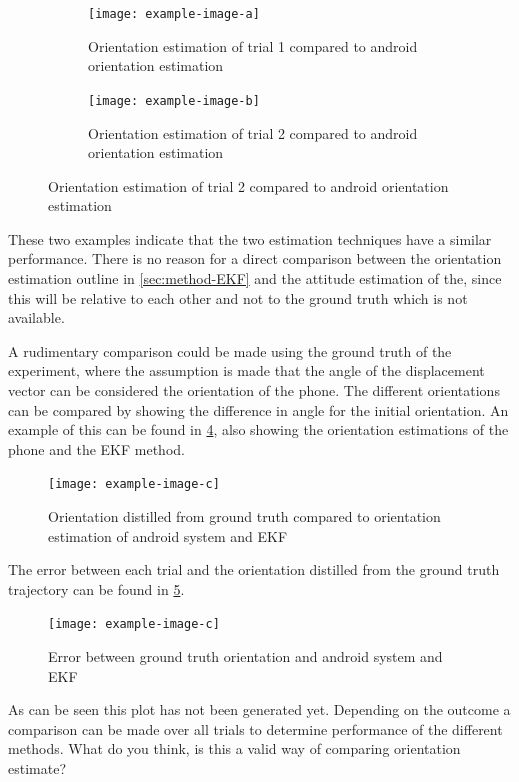\begin{figure}[H]
	\centering
	\begin{subfigure}[t]{.45\textwidth}
	\centering
	\texttt{[image: example-image-a]}
	\caption{Orientation estimation of trial 1 compared to android orientation estimation}
	\label{fig:trail1 - shs}
\end{subfigure}\quad
\begin{subfigure}[t]{.45\textwidth}
	\centering
	\texttt{[image: example-image-b]}
	\caption{Orientation estimation of trial 2 compared to android orientation estimation}
	\label{fig:trail2 - shs}
\end{subfigure}
\end{figure}

These two examples indicate that the two estimation techniques have a similar performance. There is no reason for a direct comparison between the orientation estimation outline in \cref{sec:method-EKF} and the attitude estimation of the, since this will be relative to each other and not to the ground truth which is not available. 

A rudimentary comparison could be made using the ground truth of the experiment, where the assumption is made that the angle of the displacement vector can be considered the orientation of the phone. The different orientations can be compared by showing the difference in angle for the initial orientation. An example of this can be found in \cref{fig:orientation_comparison}, also showing the orientation estimations of the phone and the EKF method.

\begin{figure}[H]
	\centering
	\texttt{[image: example-image-c]}
	\caption{Orientation distilled from ground truth compared to orientation estimation of android system and EKF}
	\label{fig:orientation_comparison}
\end{figure}

The error between each trial and the orientation distilled from the ground truth trajectory can be found in \cref{fig:orientation_error_comparison}.

\begin{figure}[H]
	\centering
	\texttt{[image: example-image-c]}
	\caption{Error between ground truth orientation and android system and EKF}
	\label{fig:orientation_error_comparison}
\end{figure}


{\color{red}As can be seen this plot has not been generated yet. Depending on the outcome a comparison can be made over all trials to determine performance of the different methods. What do you think, is this a valid way of comparing orientation estimate?}


